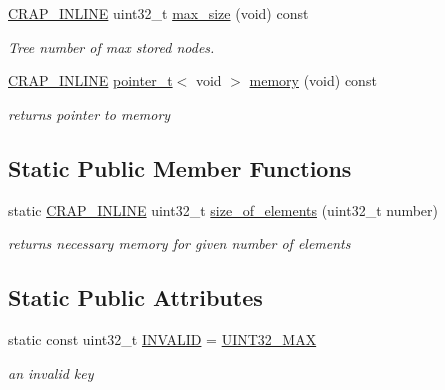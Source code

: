 \begin{DoxyCompactItemize}
\hyperlink{config__x86_8h_a5a40526b8d842e7ff731509998bb0f1c}{C\+R\+A\+P\+\_\+\+I\+N\+L\+I\+N\+E} uint32\+\_\+t \hyperlink{classcrap_1_1tree_a325ba8dd1d5a510ce50116817583b605}{max\+\_\+size} (void) const 
\begin{DoxyCompactList}\small\item\em Tree number of max stored nodes. \end{DoxyCompactList}\item 
\hyperlink{config__x86_8h_a5a40526b8d842e7ff731509998bb0f1c}{C\+R\+A\+P\+\_\+\+I\+N\+L\+I\+N\+E} \hyperlink{structcrap_1_1pointer__t}{pointer\+\_\+t}$<$ void $>$ \hyperlink{classcrap_1_1tree_a64f079b15a1560ee59595e23a550d1d3}{memory} (void) const 
\begin{DoxyCompactList}\small\item\em returns pointer to memory \end{DoxyCompactList}\end{DoxyCompactItemize}
\subsection*{Static Public Member Functions}
\begin{DoxyCompactItemize}
\item 
static \hyperlink{config__x86_8h_a5a40526b8d842e7ff731509998bb0f1c}{C\+R\+A\+P\+\_\+\+I\+N\+L\+I\+N\+E} uint32\+\_\+t \hyperlink{classcrap_1_1tree_a5822b8d9f7be9a4ddd0cabe2f953449f}{size\+\_\+of\+\_\+elements} (uint32\+\_\+t number)
\begin{DoxyCompactList}\small\item\em returns necessary memory for given number of elements \end{DoxyCompactList}\end{DoxyCompactItemize}
\subsection*{Static Public Attributes}
\begin{DoxyCompactItemize}
\item 
static const uint32\+\_\+t \hyperlink{classcrap_1_1tree_a798699e5ef5bc72a80797f8ca2d4a5fe}{I\+N\+V\+A\+L\+I\+D} = \hyperlink{crap__types_8h_ab5eb23180f7cc12b7d6c04a8ec067fdd}{U\+I\+N\+T32\+\_\+\+M\+A\+X}
\begin{DoxyCompactList}\small\item\em an invalid key \end{DoxyCompactList}\end{DoxyCompactItemize}



